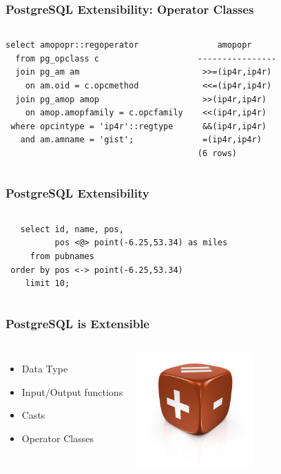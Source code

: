 \documentclass{beamer}
\begin{document}
\begin{frame}[fragile]
  \frametitle{PostgreSQL Extensibility: Operator Classes}

  \vfill

\begin{columns}
\begin{verbatim}
select amopopr::regoperator
  from pg_opclass c
  join pg_am am
    on am.oid = c.opcmethod
  join pg_amop amop
    on amop.amopfamily = c.opcfamily
 where opcintype = 'ip4r'::regtype
   and am.amname = 'gist';
\end{verbatim}  
\begin{verbatim}
    amopopr     
----------------
 >>=(ip4r,ip4r)
 <<=(ip4r,ip4r)
 >>(ip4r,ip4r)
 <<(ip4r,ip4r)
 &&(ip4r,ip4r)
 =(ip4r,ip4r)
(6 rows)
\end{verbatim}
\end{columns}
\end{frame}

\begin{frame}[fragile]
  \frametitle{PostgreSQL Extensibility}

\begin{columns}
\begin{verbatim}
   select id, name, pos,
          pos <@> point(-6.25,53.34) as miles
     from pubnames
 order by pos <-> point(-6.25,53.34)
    limit 10;
\end{verbatim}
\end{columns}
\end{frame}

\begin{frame}[fragile]
  \frametitle{PostgreSQL is Extensible}

  \vfill

\begin{columns}[c]

  \begin{itemize}
  \item Data Type
  \item Input/Output functions
  \item Casts
  \item Operator Classes
  \end{itemize}

\begin{center}
  \includegraphics[height=12em]{plus-equal-sign-1024x1024.jpg}
\end{center}
\end{columns}
\end{frame}
\end{document}
